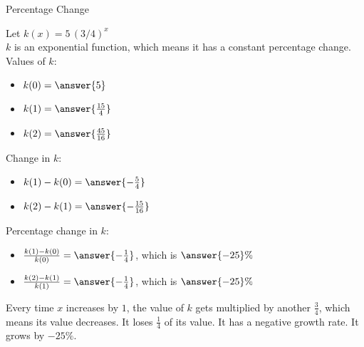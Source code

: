 \documentclass{ximera}
\begin{document}
\begin{example} Percentage Change



Let $k(x) = 5 \, (3/4)^x$ \\

$k$ is an exponential function, which means it has a constant percentage change. \\

Values of $k$:

\begin{itemize}
\item $k(0) = \answer{5}$

\item $k(1) = \answer{\frac{15}{4}}$

\item $k(2) = \answer{\frac{45}{16}}$
\end{itemize}



Change in $k$:

\begin{itemize}
\item $k(1) - k(0) = \answer{-\frac{5}{4}}$

\item $k(2) - k(1) = \answer{-\frac{15}{16}}$

\end{itemize}





Percentage change in $k$:

\begin{itemize}
\item $\frac{k(1) - k(0)}{k(0)} = \answer{-\frac{1}{4}}$, which is $\answer{-25}\%$

\item $\frac{k(2) - k(1)}{k(1)} = \answer{-\frac{1}{4}}$, which is $\answer{-25}\%$

\end{itemize}






\end{example}

Every time $x$ increases by $1$, the value of $k$ gets multiplied by another $\frac{3}{4}$, which means its value decreases. It loses $\frac{1}{4}$ of its value. It has a negative growth rate. It grows by $-25\%$.
\end{document}
